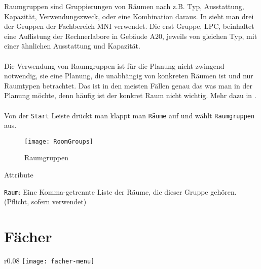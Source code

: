 Raumgruppen sind Gruppierungen von Räumen nach z.B. Typ, Ausstattung, Kapazität, Verwendungszweck, oder eine Kombination daraus. In  sieht man drei der Gruppen der Fachbereich MNI verwendet. Die erst Gruppe, LPC, beinhaltet eine Auflistung der Rechnerlabore in Gebäude A20, jeweils von gleichen Typ, mit einer ähnlichen Ausstattung und Kapazität.\\
\\
Die Verwendung von Raumgruppen ist für die Planung nicht zwingend notwendig, sie eine Planung, die unabhängig von konkreten Räumen ist und nur Raumtypen betrachtet. Das ist in den meisten Fällen genau das was man in der Planung möchte, denn häufig ist der konkret Raum nicht wichtig. Mehr dazu in .\\
\\ 
Von der \texttt{Start} Leiste drückt man klappt man \texttt{Räume} auf und wählt \texttt{Raumgruppen} aus.

\begin{figure}[h]
	\centering
	\texttt{[image: RoomGroups]}
	\vspace{-5pt}
	\caption{Raumgruppen}
	\label{fig:roomgroups}
\end{figure}

\noindent
{\large Attribute\par}
\vspace{8pt}

\noindent
\texttt{Raum}: Eine Komma-getrennte Liste der Räume, die dieser Gruppe gehören. (Pflicht, sofern verwendet)\\

\newpage

\section{Fächer}

\begin{wrapfigure}{r}{0.08\textwidth}
	\vspace{-80pt}
	\texttt{[image: facher-menu]}
\end{wrapfigure}

\vspace{35pt}

